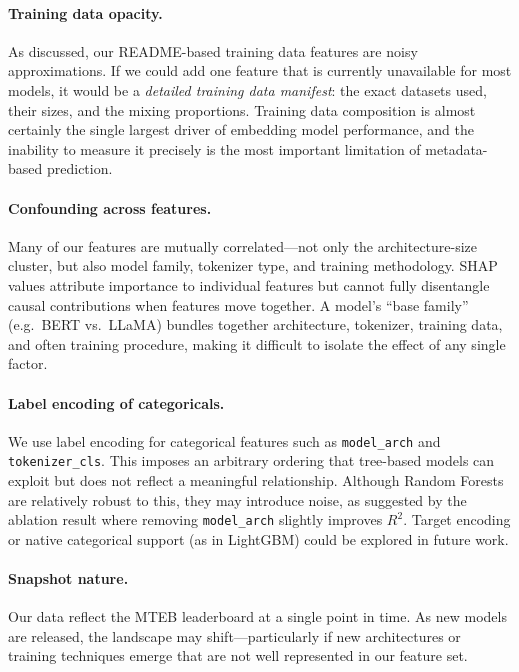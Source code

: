 \documentclass[11pt,a4paper,twocolumn]{article}
\begin{document}
\paragraph{Training data opacity.}
As discussed, our README-based training data features are noisy approximations.
If we could add one feature that is currently unavailable for most models, it would be a \emph{detailed training data manifest}: the exact datasets used, their sizes, and the mixing proportions.
Training data composition is almost certainly the single largest driver of embedding model performance, and the inability to measure it precisely is the most important limitation of metadata-based prediction.

\paragraph{Confounding across features.}
Many of our features are mutually correlated---not only the architecture-size cluster, but also model family, tokenizer type, and training methodology.
SHAP values attribute importance to individual features but cannot fully disentangle causal contributions when features move together.
A model's ``base family'' (e.g.\ BERT vs.\ LLaMA) bundles together architecture, tokenizer, training data, and often training procedure, making it difficult to isolate the effect of any single factor.

\paragraph{Label encoding of categoricals.}
We use label encoding for categorical features such as \texttt{model\_arch} and \texttt{tokenizer\_cls}.
This imposes an arbitrary ordering that tree-based models can exploit but does not reflect a meaningful relationship. Although Random Forests are relatively robust to this, they may introduce noise, as suggested by the ablation result where removing \texttt{model\_arch} slightly improves $R^2$.
Target encoding or native categorical support (as in LightGBM) could be explored in future work.

\paragraph{Snapshot nature.}
Our data reflect the MTEB leaderboard at a single point in time.
As new models are released, the landscape may shift---particularly if new architectures or training techniques emerge that are not well represented in our feature set.
\end{document}
